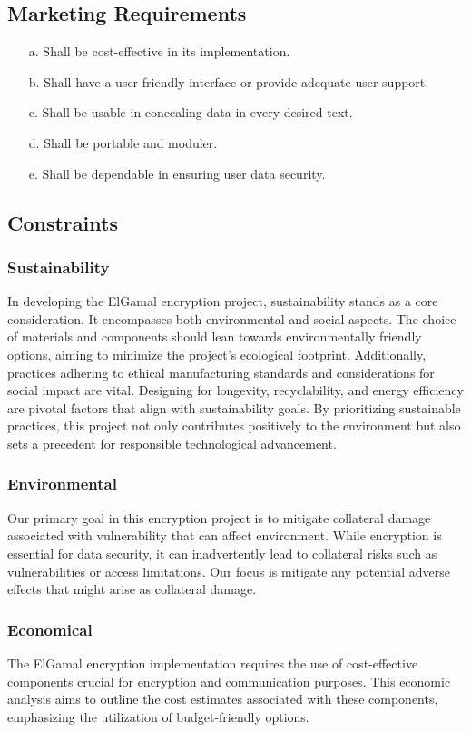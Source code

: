\documentclass[12pt]{article}
\begin{document}
	\subsection{Marketing Requirements}
	\begin{enumerate}
		\item[a.] Shall be cost-effective in its implementation.
		\item[b.] Shall have a user-friendly interface or provide adequate user support.
		\item[c.] Shall be usable in concealing data in every desired text.
		\item[d.] Shall be portable and moduler.
		\item[e.] Shall be dependable in ensuring user data security.				
	\end{enumerate}
	\subsection{Constraints}
		\subsubsection{Sustainability}
		In developing the ElGamal encryption project, sustainability stands as a core consideration. It encompasses both environmental and social aspects. The choice of materials and components should lean towards environmentally friendly options, aiming to minimize the project's ecological footprint. Additionally, practices adhering to ethical manufacturing standards and considerations for social impact are vital. Designing for longevity, recyclability, and energy efficiency are pivotal factors that align with sustainability goals. By prioritizing sustainable practices, this project not only contributes positively to the environment but also sets a precedent for responsible technological advancement.
		\subsubsection{Environmental}
		Our primary goal in this encryption project is to mitigate collateral damage associated with vulnerability that can affect environment. While encryption is essential for data security, it can inadvertently lead to collateral risks such as vulnerabilities or access limitations. Our focus is mitigate any potential adverse effects that might arise as collateral damage.
		\subsubsection{Economical}
		The ElGamal encryption implementation requires the use of cost-effective components crucial for encryption and communication purposes. This economic analysis aims to outline the cost estimates associated with these components, emphasizing the utilization of budget-friendly options.
		
\end{document}
